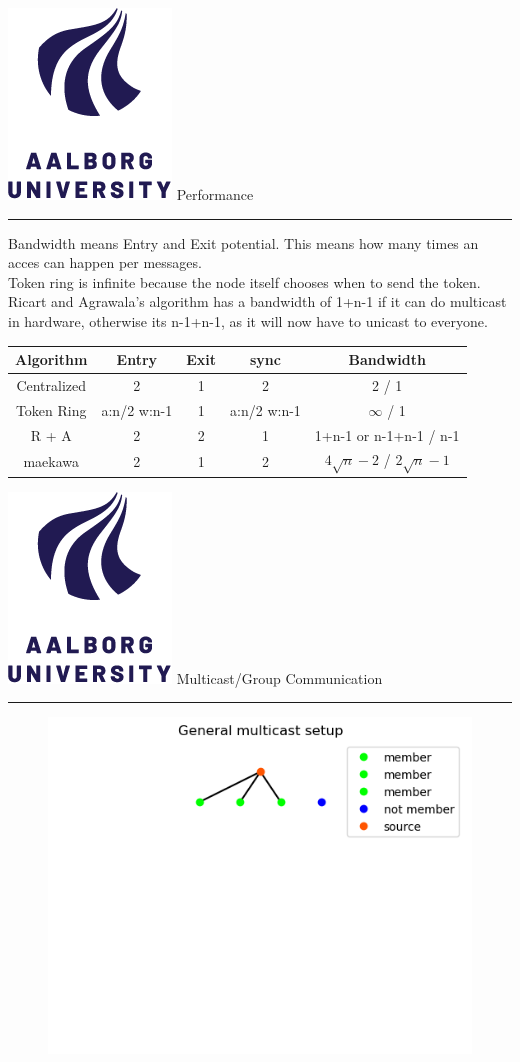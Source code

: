 \documentclass[aspectratio=1610,17pt,utf8]{beamer}
\newcommand{\mainframe}[1]{\color{blue} \includegraphics[width=.05\textwidth]{figures/aau.png} #1\\\color{black}\hrule}
\newcommand{\regularframe}[1]{\color{black}\includegraphics[width=.05\textwidth]{figures/aau.png} #1\\\hrule}
\begin{document}
\begin{frame}{\regularframe{Performance}}
    Bandwidth means Entry and Exit potential. This means how many times an acces can happen per messages.\\
    Token ring is infinite because the node itself chooses when to send the token.\\
    Ricart and Agrawala's algorithm has a bandwidth of 1+n-1 if it can do multicast in hardware, otherwise its n-1+n-1, as it will now have to unicast to everyone.
    \tiny{\begin{table}
        \begin{tabular}{|c|c|c|c|c|}
            \hline
            Algorithm & Entry & Exit & sync & Bandwidth \\\hline
            Centralized & 2 & 1 & 2 & 2 / 1 \\\hline
            Token Ring & a:n/2 w:n-1 & 1 & a:n/2 w:n-1 & $\infty$ / 1 \\\hline
            R + A & 2 & 2 & 1 & 1+n-1 or n-1+n-1 / n-1 \\\hline
            maekawa & 2 & 1 & 2 & $4 \sqrt{n}-2$ / $2 \sqrt{n}-1$ \\\hline
        \end{tabular}
    \end{table}}
\end{frame}

\begin{frame}{\mainframe{Multicast/Group Communication}}

    \begin{figure}
        \includegraphics[width=1\textwidth]{figures/2-multicast-group.png}
    \end{figure}
\end{frame}
\end{document}
